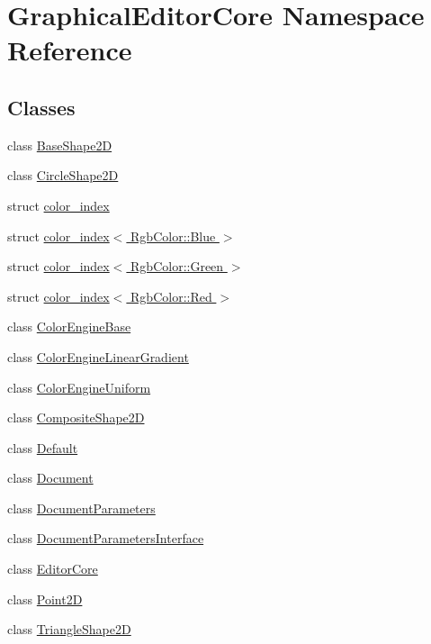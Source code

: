 \hypertarget{namespaceGraphicalEditorCore}{}\section{Graphical\+Editor\+Core Namespace Reference}
\label{namespaceGraphicalEditorCore}
\subsection*{Classes}
\begin{DoxyCompactItemize}
\item 
class \hyperlink{classGraphicalEditorCore_1_1BaseShape2D}{Base\+Shape2D}
\item 
class \hyperlink{classGraphicalEditorCore_1_1CircleShape2D}{Circle\+Shape2D}
\item 
struct \hyperlink{structGraphicalEditorCore_1_1color__index}{color\+\_\+index}
\item 
struct \hyperlink{structGraphicalEditorCore_1_1color__index_3_01RgbColor_1_1Blue_01_4}{color\+\_\+index$<$ Rgb\+Color\+::\+Blue $>$}
\item 
struct \hyperlink{structGraphicalEditorCore_1_1color__index_3_01RgbColor_1_1Green_01_4}{color\+\_\+index$<$ Rgb\+Color\+::\+Green $>$}
\item 
struct \hyperlink{structGraphicalEditorCore_1_1color__index_3_01RgbColor_1_1Red_01_4}{color\+\_\+index$<$ Rgb\+Color\+::\+Red $>$}
\item 
class \hyperlink{classGraphicalEditorCore_1_1ColorEngineBase}{Color\+Engine\+Base}
\item 
class \hyperlink{classGraphicalEditorCore_1_1ColorEngineLinearGradient}{Color\+Engine\+Linear\+Gradient}
\item 
class \hyperlink{classGraphicalEditorCore_1_1ColorEngineUniform}{Color\+Engine\+Uniform}
\item 
class \hyperlink{classGraphicalEditorCore_1_1CompositeShape2D}{Composite\+Shape2D}
\item 
class \hyperlink{classGraphicalEditorCore_1_1Default}{Default}
\item 
class \hyperlink{classGraphicalEditorCore_1_1Document}{Document}
\item 
class \hyperlink{classGraphicalEditorCore_1_1DocumentParameters}{Document\+Parameters}
\item 
class \hyperlink{classGraphicalEditorCore_1_1DocumentParametersInterface}{Document\+Parameters\+Interface}
\item 
class \hyperlink{classGraphicalEditorCore_1_1EditorCore}{Editor\+Core}
\item 
class \hyperlink{classGraphicalEditorCore_1_1Point2D}{Point2D}
\item 
class \hyperlink{classGraphicalEditorCore_1_1TriangleShape2D}{Triangle\+Shape2D}
\end{DoxyCompactItemize}
